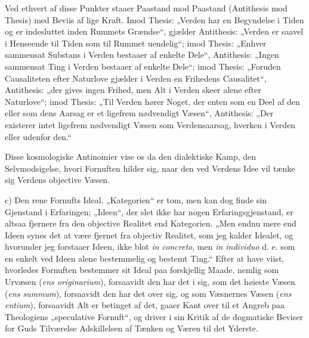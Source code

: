 \documentclass[12pt]{book}
\newcommand{\opage}[1]{\marginnote{\footnotesize\textit{[#1]}}}
\begin{document}
Ved ethvert af disse Punkter staaer Paastand mod Paastand (Antithesis mod Thesis)
med Beviis af lige Kraft. Imod Thesis: „Verden har en Begyndelse i Tiden og er
indesluttet inden Rummets Grændse“, gjælder Antithesis: „Verden er saavel i
Henseende til Tiden som til Rummet uendelig“; imod Thesis: „Enhver sammensat
Substans i Verden bestaaer af enkelte Dele“, Antithesis: „Ingen sammensat Ting i
Verden bestaaer af enkelte Dele“; imod Thesis: „Foruden Causaliteten efter
Naturlove gjælder i Verden en
\opage{30} Frihedens Causalitet“, Antithesis: „der gives ingen Frihed, men Alt i Verden skeer
alene efter Naturlove“; imod Thesis: „Til Verden hører Noget, der enten som en Deel
af den eller som dens Aarsag er et ligefrem nødvendigt Væsen“, Antithesis: „Der
existerer intet ligefrem nødvendigt Væsen som Verdensaarsag, hverken i Verden eller
udenfor den.“

Disse kosmologiske Antinomier vise os da den dialektiske Kamp, den Selvmodsigelse,
hvori Fornuften hilder sig, naar den ved Verdens Idee vil tænke sig Verdens
objective Væsen.

c) Den rene Fornufts Ideal. „Kategorien“ er tom, men kan dog finde sin Gjenstand i
Erfaringen; „Ideen“, der slet ikke har nogen Erfaringsgjenstand, er altsaa fjernere
fra den objective Realitet end Kategorien. „Men endnu mere end Ideen synes det at
være fjernet fra objectiv Realitet, som jeg kalder Idealet, og hvorunder jeg
forstaaer Ideen, ikke blot \textit{in concreto}, men \textit{in individuo} d. e. som
en enkelt ved Ideen alene bestemmelig og bestemt Ting.“ Efter at have viist,
hvorledes Fornuften bestemmer sit Ideal paa forskjellig Maade, nemlig som Urvæsen
(\textit{ens originarium}), forsaavidt den har det i sig, som det høieste Væsen
(\textit{ens summum}), forsaavidt den har det over sig, og som Væsnernes Væsen
(\textit{ens entium}), forsaavidt Alt er betinget af det, gaaer Kant over til et
Angreb paa Theologiens „speculative Fornuft“, og driver i sin Kritik af de
dogmatiske Beviser for Guds Tilværelse Adskillelsen af Tænken og Væren til det
Yderste.
\end{document}
